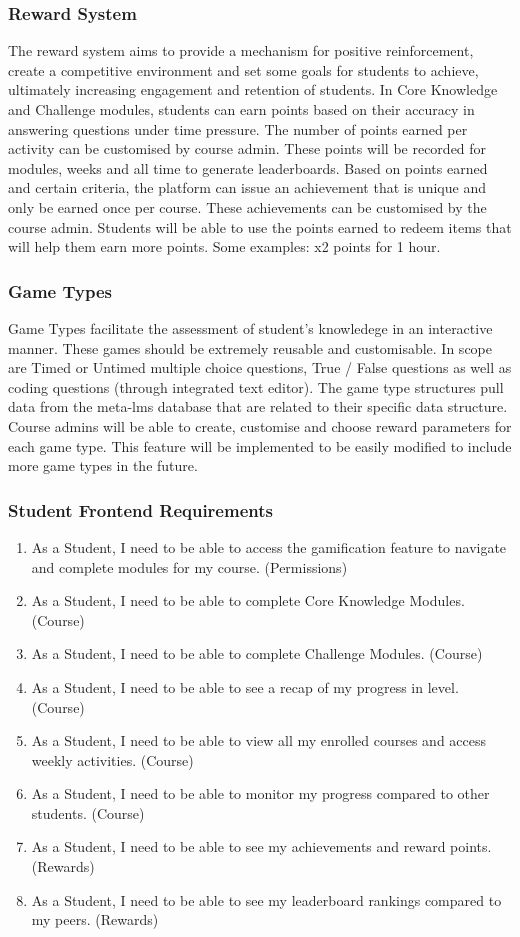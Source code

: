 \subsubsection{Reward System}
The reward system aims to provide a mechanism for positive reinforcement, create a competitive environment and set some goals for students to achieve, ultimately increasing engagement and retention of students.
In Core Knowledge and Challenge modules, students can earn points based on their accuracy in answering questions under time pressure. The number of points earned per activity can be customised by course admin. These points will be recorded for modules, weeks and all time to generate leaderboards. Based on points earned and certain criteria, the platform can issue an achievement that is unique and only be earned once per course. These achievements can be customised by the course admin. Students will be able to use the points earned to redeem items that will help them earn more points. Some examples: x2 points for 1 hour. 

\subsubsection{Game Types}
Game Types facilitate the assessment of student's knowledege in an interactive manner. These games should be extremely reusable and customisable.
In scope are Timed or Untimed multiple choice questions, True / False questions as well as coding questions (through integrated text editor). The game type structures pull data from the meta-lms database that are related to their specific data structure. Course admins will be able to create, customise and choose reward parameters for each game type. This feature will be implemented to be easily modified to include more game types in the future.

\subsubsection{Student Frontend Requirements}
\begin{enumerate}
    \item As a Student, I need to be able to access the gamification feature to navigate and complete modules for my course. (Permissions)
    \item As a Student, I need to be able to complete Core Knowledge Modules. (Course)
    \item As a Student, I need to be able to complete Challenge Modules. (Course)
    \item As a Student, I need to be able to see a recap of my progress in level. (Course)
    \item As a Student, I need to be able to view all my enrolled courses and access weekly activities. (Course)
    \item As a Student, I need to be able to monitor my progress compared to other students. (Course)
    \item As a Student, I need to be able to see my achievements and reward points. (Rewards)
    \item As a Student, I need to be able to see my leaderboard rankings compared to my peers. (Rewards)
\end{enumerate}

